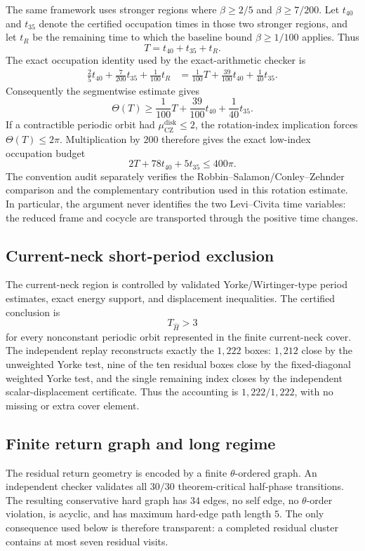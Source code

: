 \documentclass[11pt]{article}
\newcommand{\CZ}{\mu_{\mathrm{CZ}}}
\begin{document}
The same framework uses stronger regions where $\beta\ge2/5$ and $\beta\ge7/200$. Let $t_{40}$ and $t_{35}$ denote the certified occupation times in those two stronger regions, and let $t_R$ be the remaining time to which the baseline bound $\beta\ge1/100$ applies. Thus
\[
T=t_{40}+t_{35}+t_R.
\]
The exact occupation identity used by the exact-arithmetic checker is
\begin{align*}
\frac25 t_{40}+\frac7{200}t_{35}+\frac1{100}t_R
&=\frac1{100}T+\frac{39}{100}t_{40}+\frac1{40}t_{35}.
\end{align*}
Consequently the segmentwise estimate gives
\[
\Theta(T)\ge \frac1{100}T+\frac{39}{100}t_{40}+\frac1{40}t_{35}.
\]
If a contractible periodic orbit had $\CZ^{\mathrm{disk}}\le2$, the rotation-index implication forces $\Theta(T)\le2\pi$. Multiplication by $200$ therefore gives the exact low-index occupation budget
\[
2T+78t_{40}+5t_{35}\le400\pi.
\]
The convention audit separately verifies the Robbin--Salamon/Conley--Zehnder comparison and the complementary contribution used in this rotation estimate. In particular, the argument never identifies the two Levi--Civita time variables: the reduced frame and cocycle are transported through the positive time changes.

\subsection{Current-neck short-period exclusion}
The current-neck region is controlled by validated Yorke/Wirtinger-type period estimates, exact energy support, and displacement inequalities. The certified conclusion is
\[
T_{\widehat H}>3
\]
for every nonconstant periodic orbit represented in the finite current-neck cover. The independent replay reconstructs exactly the $1{,}222$ boxes: $1{,}212$ close by the unweighted Yorke test, nine of the ten residual boxes close by the fixed-diagonal weighted Yorke test, and the single remaining index closes by the independent scalar-displacement certificate. Thus the accounting is $1{,}222/1{,}222$, with no missing or extra cover element.

\subsection{Finite return graph and long regime}
The residual return geometry is encoded by a finite $\theta$-ordered graph. An independent checker validates all $30/30$ theorem-critical half-phase transitions. The resulting conservative hard graph has $34$ edges, no self edge, no $\theta$-order violation, is acyclic, and has maximum hard-edge path length $5$. The only consequence used below is therefore transparent: a completed residual cluster contains at most seven residual visits.
\end{document}
